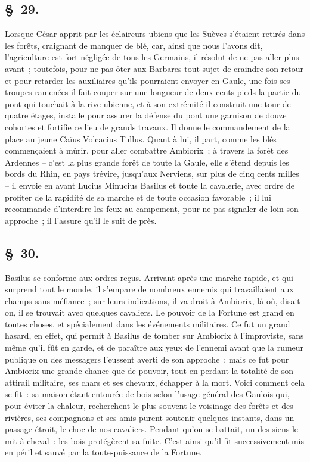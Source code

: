 \documentclass[french,twoside]{book} %
\begin{document}
\subsection[{§ 29.}]{ \textsc{§ 29.} }
\noindent Lorsque César apprit par les éclaireurs ubiens que les Suèves s’étaient retirés dans les forêts, craignant de manquer de blé, car, ainsi que nous l’avons dit, l’agriculture est fort négligée de tous les Germains, il résolut de ne pas aller plus avant ; toutefois, pour ne pas ôter aux Barbares tout sujet de craindre son retour et pour retarder les auxiliaires qu’ils pourraient envoyer en Gaule, une fois ses troupes ramenées il fait couper sur une longueur de deux cents pieds la partie du pont qui touchait à la rive ubienne, et à son extrémité il construit une tour de quatre étages, installe pour assurer la défense du pont une garnison de douze cohortes et fortifie ce lieu de grands travaux. Il donne le commandement de la place au jeune Caïus Volcacius Tullus. Quant à lui, il part, comme les blés commençaient à mûrir, pour aller combattre Ambiorix ; à travers la forêt des Ardennes – c’est la plus grande forêt de toute la Gaule, elle s’étend depuis les bords du Rhin, en pays trévire, jusqu’aux Nerviens, sur plus de cinq cents milles – il envoie en avant Lucius Minucius Basilus et toute la cavalerie, avec ordre de profiter de la rapidité de sa marche et de toute occasion favorable ; il lui recommande d’interdire les feux au campement, pour ne pas signaler de loin son approche ; il l’assure qu’il le suit de près.
\subsection[{§ 30.}]{ \textsc{§ 30.} }
\noindent Basilus se conforme aux ordres reçus. Arrivant après une marche rapide, et qui surprend tout le monde, il s’empare de nombreux ennemis qui travaillaient aux champs sans méfiance ; sur leurs indications, il va droit à Ambiorix, là où, disait-on, il se trouvait avec quelques cavaliers. Le pouvoir de la Fortune est grand en toutes choses, et spécialement dans les événements militaires. Ce fut un grand hasard, en effet, qui permit à Basilus de tomber sur Ambiorix à l’improviste, sans même qu’il fût en garde, et de paraître aux yeux de l’ennemi avant que la rumeur publique ou des messagers l’eussent averti de son approche ; mais ce fut pour Ambiorix une grande chance que de pouvoir, tout en perdant la totalité de son attirail militaire, ses chars et ses chevaux, échapper à la mort. Voici comment cela se fit : sa maison étant entourée de bois selon l’usage général des Gaulois qui, pour éviter la chaleur, recherchent le plus souvent le voisinage des forêts et des rivières, ses compagnons et ses amis purent soutenir quelques instants, dans un passage étroit, le choc de nos cavaliers. Pendant qu’on se battait, un des siens le mit à cheval : les bois protégèrent sa fuite. C'est ainsi qu’il fit successivement mis en péril et sauvé par la toute-puissance de la Fortune.
\end{document}
